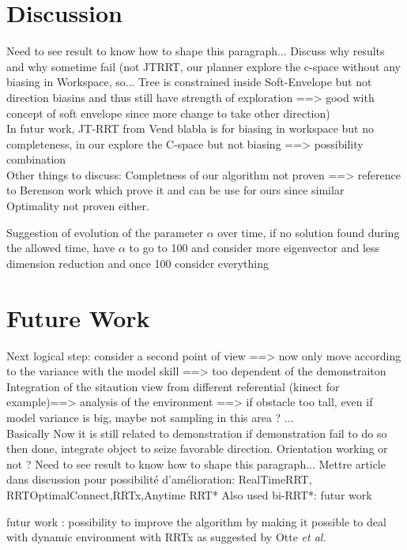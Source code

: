 \documentclass[letterpaper, 10 pt, conference]{ieeeconf}  %
\begin{document}
\section{Discussion}
  Need to see result to know how to shape this paragraph...
Discuss why results and why sometime fail (not JTRRT, our planner explore the c-space without any biasing in Workspace, so... Tree is constrained inside Soft-Envelope but not direction biasins and thus still have strength of exploration ==> good with concept of soft envelope since more change to take other direction)\\

In futur work, JT-RRT from Vend blabla is for biasing in workspace but no completeness, in our explore the C-space but not biasing ==> possibility combination\\

Other things to discuss: Completness of our algorithm not proven ==> reference to Berenson work which prove it and can be use for ours since similar\\

Optimality not proven either.

Suggestion of evolution of the parameter $\alpha$ over time, if no solution found during the allowed time, have $\alpha$ to go to 100 and consider more eigenvector and less dimension reduction and once 100 consider everything \\

\section{Future Work}
Next logical step: consider a second point of view ==> now only move according to the variance with the model skill ==> too dependent of the demonstraiton
Integration of the sitaution view from different referential (kinect for example)==> analysis of the environment ==> if obstacle too tall, even if model variance is big, maybe not sampling in this area ? ... \\
Basically Now it is still related to demonstration if demonstration fail to do so then done, integrate object to seize favorable direction.
Orientation working or not ?  Need to see result to know how to shape this paragraph...
Mettre article dans discussion pour possibilité d'amélioration:
RealTimeRRT, RRTOptimalConnect,RRTx,Anytime RRT*
Also used bi-RRT*: futur work

futur work : possibility to improve the algorithm by making it possible to deal with dynamic environment with RRTx as suggested by Otte \textit{et al.} \cite{RRTx}
\end{document}
